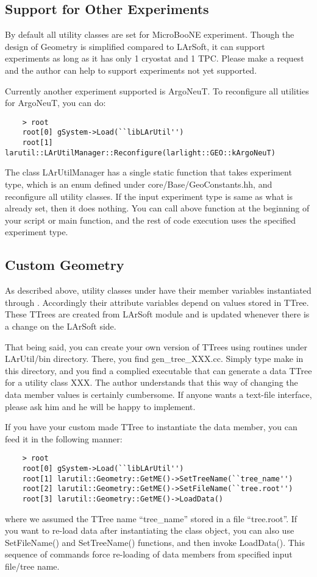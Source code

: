 \subsection{Support for Other Experiments}
By default all utility classes are set for MicroBooNE experiment. Though the design of {\ttfamily Geometry} is simplified compared to LArSoft, it can support experiments as long as it has only 1 cryostat and 1 TPC. Please make a request and the author can help to support experiments not yet supported. 

Currently another experiment supported is ArgoNeuT. To reconfigure all utilities for ArgoNeuT, you can do:
\begin{lstlisting}
    > root
    root[0] gSystem->Load(``libLArUtil'')
    root[1] larutil::LArUtilManager::Reconfigure(larlight::GEO::kArgoNeuT)
\end{lstlisting}
The class {\ttfamily LArUtilManager} has a single static function that takes experiment type, which is an {\ttfamily enum} defined under {\ttfamily core/Base/GeoConstants.hh}, and reconfigure all utility classes. If the input experiment type is same as what is already set, then it does nothing. You can call above function at the beginning of your script or {\ttfamily main} function, and the rest of code execution uses the specified experiment type.

\subsection{Custom Geometry}
As described above, utility classes under \LArUtil have their member variables instantiated through . Accordingly their attribute variables depend on values stored in {\ttfamily TTree}. These {\ttfamily TTree}s are created from LArSoft module and is updated whenever there is a change on the LArSoft side. 

That being said, you can create your own version of TTrees using routines under {\ttfamily LArUtil/bin} directory. There, you find {\ttfamily gen\_tree\_XXX.cc}. Simply type {\ttfamily make} in this directory, and you find a complied executable that can generate a data {\ttfamily TTree} for a utility class {\ttfamily XXX}. The author understands that this way of changing the data member values is certainly cumbersome. If anyone wants a text-file interface, please ask him and he will be happy to implement.

If you have your custom made {\ttfamily TTree} to instantiate the data member, you can feed it in the following manner:
\begin{lstlisting}
    > root
    root[0] gSystem->Load(``libLArUtil'')
    root[1] larutil::Geometry::GetME()->SetTreeName(``tree_name'')
    root[2] larutil::Geometry::GetME()->SetFileName(``tree.root'')
    root[3] larutil::Geometry::GetME()->LoadData()
\end{lstlisting}
where we assumed the {\ttfamily TTree} name ``tree\_name'' stored in a \ROOT file ``tree.root''. If you want to re-load data after instantiating the class object, you can also use {\ttfamily SetFileName()} and {\ttfamily SetTreeName()} functions, and then invoke {\ttfamily LoadData()}. This sequence of commands force re-loading of data members from specified input file/tree name.
